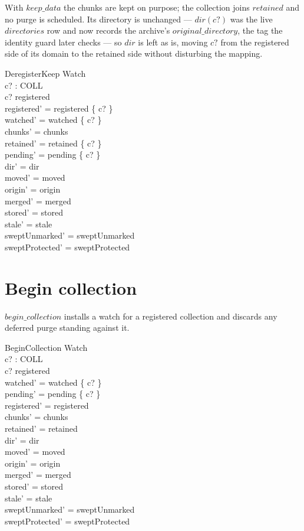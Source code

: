 \documentclass[a4paper]{article}
\begin{document}
With $keep\_data$ the chunks are kept on purpose; the collection joins
$retained$ and no purge is scheduled.  Its directory is unchanged --- $dir(c?)$
was the live $directories$ row and now records the archive's
$original\_directory$, the tag the identity guard later checks --- so $dir$ is
left as is, moving $c?$ from the registered side of its domain to the retained
side without disturbing the mapping.

\begin{schema}{DeregisterKeep}
  \Delta Watch \\
  c? : COLL \\
  \where
  c? \in registered \\
  registered' = registered \setminus \{ c? \} \\
  watched' = watched \setminus \{ c? \} \\
  chunks' = chunks \\
  retained' = retained \cup \{ c? \} \\
  pending' = pending \setminus \{ c? \} \\
  dir' = dir \\
  moved' = moved \\
  origin' = origin \\
  merged' = merged \\
  stored' = stored \\
  stale' = stale \\
  sweptUnmarked' = sweptUnmarked \\
  sweptProtected' = sweptProtected
\end{schema}

\section{Begin collection}

$begin\_collection$ installs a watch for a registered collection and discards any
deferred purge standing against it.

\begin{schema}{BeginCollection}
  \Delta Watch \\
  c? : COLL \\
  \where
  c? \in registered \\
  watched' = watched \cup \{ c? \} \\
  pending' = pending \setminus \{ c? \} \\
  registered' = registered \\
  chunks' = chunks \\
  retained' = retained \\
  dir' = dir \\
  moved' = moved \\
  origin' = origin \\
  merged' = merged \\
  stored' = stored \\
  stale' = stale \\
  sweptUnmarked' = sweptUnmarked \\
  sweptProtected' = sweptProtected
\end{schema}
\end{document}
